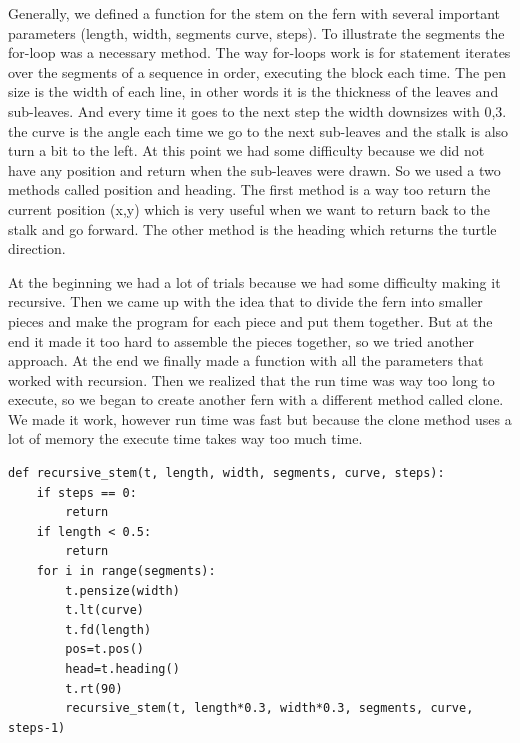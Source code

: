\documentclass[titlepage]{article}
\begin{document}
Generally, we defined a function for the stem on the fern with several important parameters (length, width, segments curve, steps). To illustrate the segments the for-loop was a necessary method. The way for-loops work is for statement iterates over the segments of a sequence in order, executing the block each time. The pen size is the width of each line, in other words it is the thickness of the leaves and sub-leaves. And every time it goes to the next step the width downsizes with 0,3. the curve is the angle each time we go to the next sub-leaves and the stalk is also turn a bit to the left. At this point we had some difficulty because we did not have any position and return when the sub-leaves were drawn. So we used a two methods called position and heading. The first method is a way too return the current position (x,y) which is very useful when we want to return back to the stalk and go forward. The other method is the heading which returns the turtle direction.
\par
At the beginning we had a lot of trials because we had some difficulty making it recursive. Then we came up with the idea that to divide the fern into smaller pieces and make the program for each piece and put them together. But at the end it made it too hard to assemble the pieces together, so we tried another approach. At the end we finally made a function with all the parameters that worked with recursion. Then we realized that the run time was way too long to execute, so we began to create another fern with a different method called clone. We made it work, however run time was fast but because the clone method uses a lot of memory the execute time takes way too much time. 

\begin{verbatim}  
def recursive_stem(t, length, width, segments, curve, steps):
    if steps == 0:
        return
    if length < 0.5:
        return
    for i in range(segments):
        t.pensize(width)
        t.lt(curve)
        t.fd(length)
        pos=t.pos()
        head=t.heading()
        t.rt(90)
        recursive_stem(t, length*0.3, width*0.3, segments, curve, steps-1)
\end{verbatim}
\end{document}
